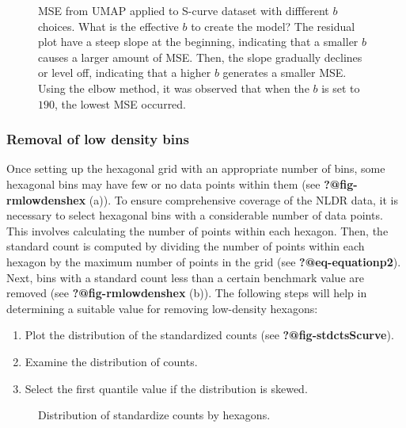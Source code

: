 \documentclass[
  12pt]{article}
\providecommand{\tightlist}{%
  \setlength{\itemsep}{0pt}\setlength{\parskip}{0pt}}\usepackage{longtable,booktabs,array}
\def\tightlist{}
\begin{document}
\begin{figure}[H]


\caption{\label{fig-mse-scurve-b}MSE from UMAP applied to S-curve
dataset with diffferent \(b\) choices. What is the effective \(b\) to
create the model? The residual plot have a steep slope at the beginning,
indicating that a smaller \(b\) causes a larger amount of MSE. Then, the
slope gradually declines or level off, indicating that a higher \(b\)
generates a smaller MSE. Using the elbow method, it was observed that
when the \(b\) is set to \(190\), the lowest MSE occurred.}

\end{figure}%

\subsubsection{Removal of low density
bins}\label{removal-of-low-density-bins}

Once setting up the hexagonal grid with an appropriate number of bins,
some hexagonal bins may have few or no data points within them (see
\textbf{?@fig-rmlowdenshex} (a)). To ensure comprehensive coverage of
the NLDR data, it is necessary to select hexagonal bins with a
considerable number of data points. This involves calculating the number
of points within each hexagon. Then, the standard count is computed by
dividing the number of points within each hexagon by the maximum number
of points in the grid (see \textbf{?@eq-equationp2}). Next, bins with a
standard count less than a certain benchmark value are removed (see
\textbf{?@fig-rmlowdenshex} (b)). The following steps will help in
determining a suitable value for removing low-density hexagons:

\begin{enumerate}
\def\labelenumi{\arabic{enumi}.}
\tightlist
\item
  Plot the distribution of the standardized counts (see
  \textbf{?@fig-stdctsScurve}).
\item
  Examine the distribution of counts.
\item
  Select the first quantile value if the distribution is skewed.
\end{enumerate}

\begin{figure}[H]


\caption{\label{fig-stdcts-scurve}Distribution of standardize counts by
hexagons.}

\end{figure}%
\end{document}
